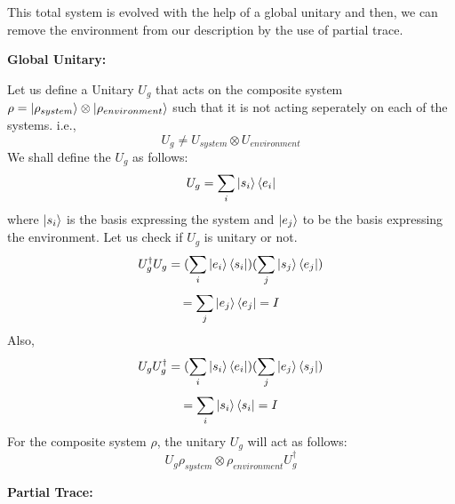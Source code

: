    This total system is evolved with the help of a global unitary and then, we can remove the environment from our description by the use of partial trace.

    \item\textbf{Global Unitary:}
    
    Let us define a Unitary $U_g$ that acts on the composite system $\rho = \ket{\rho_{system}} \otimes \ket{\rho_{environment}}$ such that it is not acting seperately on each of the systems.
    i.e.,
    \begin{equation}
        U_g \neq U_{system} \otimes U_{environment}
    \end{equation}
    We shall define the $U_g$ as follows:
    \begin{equation}
        U_g = \sum_{i} \ket{s_i} \bra{e_i}
    \end{equation}
    where $\ket{s_i}$ is the basis expressing the system and $\ket{e_j}$ to be the basis expressing the environment.
    Let us check if $U_g$ is unitary or not.
    \begin{equation}
    U_g^\dagger U_g = (\sum_i \ket{e_i} \bra{s_i})(\sum_j \ket{s_j} \bra{e_j})
    \end{equation}
    \begin{equation}
        = \sum_j\ket{e_j}\bra{e_j} = I
    \end{equation}
    Also,
    \begin{equation}
    U_gU_g^\dagger = (\sum_{i} \ket{s_i} \bra{e_i})(\sum_j \ket{e_j} \bra{s_j})
    \end{equation}
    \begin{equation}
        = \sum_i\ket{s_i}\bra{s_i} = I
    \end{equation}
    For the composite system $\rho$, the unitary $U_g$ will act as follows:
    \begin{equation}
        U_g\rho_{system} \otimes \rho_{environment}U_g^\dagger
    \end{equation}
\item\textbf{Partial Trace:}

